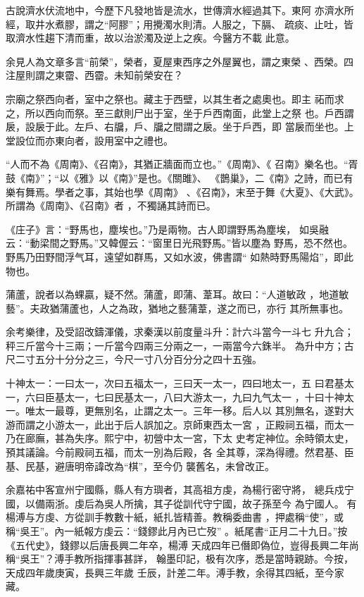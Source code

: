 \documentclass{ctexart}
\begin{document}
古說濟水伏流地中，今歷下凡發地皆是流水，世傳濟水經過其下。東阿 亦濟水所經，取井水煮膠，謂之``阿膠''；用攪濁水則清。人服之，下膈、 疏痰、止吐，皆取濟水性趨下清而重，故以治淤濁及逆上之疾。今醫方不載 此意。

余見人為文章多言``前榮''，榮者，夏屋東西序之外屋翼也，謂之東榮 、西榮。四注屋則謂之東霤、西霤。未知前榮安在？

宗廟之祭西向者，室中之祭也。藏主于西壁，以其生者之處奧也。即主 祏而求之，所以西向而祭。至三獻則尸出于室，坐于戶西南面，此堂上之祭 也。戶西謂扆，設扆于此。左戶、右牖，戶、牖之間謂之扆。坐于戶西，即 當扆而坐也。上堂設位而亦東向者，設用室中之禮也。

``人而不為《周南》、《召南》，其猶正牆面而立也。''《周南》、《 召南》樂名也。``胥鼓《南》''；``以《雅》以《南》''是也。《關雎》、 《鵲巢》，二《南》之詩，而已有樂有舞焉。學者之事，其始也學《周南》 、《召南》，末至于舞《大夏》、《大武》。所謂為《周南》、《召南》者 ，不獨誦其詩而已。

《庄子》言：``野馬也，塵埃也。''乃是兩物。古人即謂野馬為塵埃， 如吳融云：``動梁間之野馬。''又韓偓云：``窗里日光飛野馬。''皆以塵為 野馬，恐不然也。野馬乃田野間浮气耳，遠望如群馬，又如水波，佛書謂`` 如熱時野馬陽焰''，即此物也。

蒲蘆，說者以為蜾贏，疑不然。蒲蘆，即蒲、葦耳。故曰：``人道敏政 ，地道敏藝''。夫政猶蒲蘆也，人之為政，猶地之藝蒲葦，遂之而已，亦行 其所無事也。

余考樂律，及受詔改鑄渾儀，求秦漢以前度量斗升：計六斗當今一斗七 升九合；秤三斤當今十三兩；一斤當今四兩三分兩之一，一兩當今六銖半。 為升中方；古尺二寸五分十分分之三，今尺一寸八分百分分之四十五強。

十神太一：一曰太一，次曰五福太一，三曰天一太一，四曰地太一，五 曰君基太一，六曰臣基太一，七曰民基太一，八曰大游太一，九曰九气太一 ，十曰十神太一。唯太一最尊，更無別名，止謂之太一。三年一移。后人以 其別無名，遂對大游而謂之小游太一，此出于后人誤加之。京師東西太一宮 ，正殿祠五福，而太一乃在廊廡，甚為失序。熙宁中，初營中太一宮，下太 史考定神位。余時領太史，預其議論。今前殿祠五福，而太一別為后殿，各 全其尊，深為得禮。然君基、臣基、民基，避唐明帝諱改為``棋''，至今仍 襲舊名，未曾改正。

余嘉祐中客宣州宁國縣，縣人有方璵者，其高祖方虔，為楊行密守將， 總兵戍宁國，以備兩浙。虔后為吳人所擒，其子從訓代守宁國，故子孫至今 為宁國人。有楊溥与方虔、方從訓手教數十紙，紙扎皆精善。教稱委曲書 ，押處稱``使''，或稱``吳王''。內一紙報方虔云：``錢鏐此月內已亡歿'' 。紙尾書``正月二十九日。''按《五代史》，錢鏐以后唐長興二年卒，楊溥 天成四年已僭即偽位，豈得長興二年尚稱``吳王''？溥手教所指揮事甚詳， 翰墨印記，极有次序，悉是當時親跡。今按，天成四年歲庚寅，長興三年歲 壬辰，計差二年。溥手教，余得其四紙，至今家藏。
\clearpage
\end{document}
